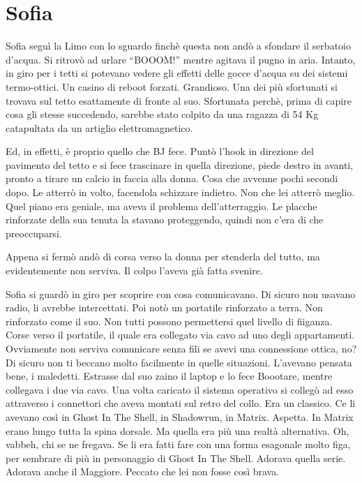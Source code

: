   \section*{Sofia}

    Sofia seguì la Limo con lo sguardo finchè questa non andò a sfondare il serbatoio d'acqua. Si ritrovò ad urlare
    ``BOOOM!'' mentre agitava il pugno in aria. Intanto, in giro per i tetti si potevano vedere gli effetti delle gocce
    d'acqua su dei sistemi termo-ottici. Un casino di reboot forzati. Grandioso. Una dei più sfortunati si trovava sul
    tetto esattamente di fronte al suo. Sfortunata perchè, prima di capire cosa gli stesse succedendo, sarebbe stato
    colpito da una ragazza di 54 Kg catapultata da un artiglio elettromagnetico.

    Ed, in effetti, è proprio quello che BJ fece. Puntò l'hook in direzione del pavimento del tetto e si fece trascinare
    in quella direzione, piede destro in avanti, pronto a tirare un calcio in faccia alla donna. Cosa che avvenne pochi
    secondi dopo. Le atterrò in volto, facendola schizzare indietro. Non che lei atterrò meglio. Quel piano era geniale,
    ma aveva il problema dell'atterraggio. Le placche rinforzate della sua tenuta la stavano proteggendo, quindi non
    c'era di che preoccuparsi.

    Appena si fermò andò di corsa verso la donna per stenderla del tutto, ma evidentemente non serviva. Il colpo l'aveva
    già fatta svenire.

    Sofia si guardò in giro per scoprire con cosa comunicavano. Di sicuro non usavano radio, li avrebbe intercettati.
    Poi notò un portatile rinforzato a terra. Non rinforzato come il suo. Non tutti possono permettersi quel livello di
    fiiganza. Corse verso il portatile, il quale era collegato via cavo ad uno degli appartamenti. Ovviamente non
    serviva comunicare senza fili se avevi una connessione ottica, no? Di sicuro non ti beccano molto facilmente in
    quelle situazioni. L'avevano pensata bene, i maledetti. Estrasse dal suo zaino il laptop e lo fece Boootare, mentre
    collegava i due via cavo. Una volta caricato il sistema operativo si collegò ad esso attraverso i connettori che
    aveva montati sul retro del collo. Era un classico. Ce li avevano così in Ghost In The Shell, in Shadowrun, in
    Matrix. Aspetta. In Matrix erano lungo tutta la spina dorsale. Ma quella era più una realtà alternativa. Oh, vabbeh,
    chi se ne fregava. Se li era fatti fare con una forma esagonale molto figa, per sembrare di più in personaggio di
    Ghost In The Shell. Adorava quella serie. Adorava anche il Maggiore. Peccato che lei non fosse così brava.

